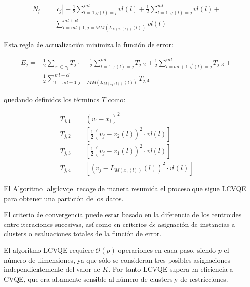 \begin{equation}
\begin{split}
N_j = & |c_j| + \frac{1}{2} \sum_{l=1,g(l) = j}^{ml} vl(l) + 
\frac{1}{2} \sum_{l=1,g^\prime (l) = j}^{ml} vl(l) + \\
& \sum_{l=ml+1,j = MM(L_{M(x_1(l))}(l))}^{ml + cl} vl(l)
\end{split}
\label{eqn41}
\end{equation}

Esta regla de actualización minimiza la función de error:

\begin{equation}
\begin{split}
E_j = & \frac{1}{2} \sum_{x_i \in c_j} T_{j,1} + 
\frac{1}{2} \sum_{l=1,g(l) = j}^{ml} T_{j,2} + 
\frac{1}{2} \sum_{l=ml + 1,g^\prime(l) = j}^{ml} T_{j,3} + \\
&\frac{1}{2} \sum_{l=ml+1,j = MM(L_{M(x_1(l))}(l))}^{ml + cl} T_{j,4}
\end{split}
\label{eqn42}
\end{equation}

quedando definidos los términos $T$ como:

\begin{equation}
\begin{split}
T_{j,1} &= (v_j - x_i)^2\\
T_{j,2} &= \left[ \frac{1}{2} (v_j - x_2(l))^2 \cdot vl(l) \right]\\
T_{j,3} &= \left[ \frac{1}{2} (v_j - x_1(l))^2 \cdot vl(l) \right]\\
T_{j,4} &= \left[ (v_j - L_{M(x_1(l))}(l))^2 \cdot vl(l) \right]
\end{split}
\label{eqn43}
\end{equation}

El Algoritmo \ref{alg:lcvqe} recoge de manera resumida el proceso que sigue \acs{LCVQE} para obtener una partición de los datos. 

El criterio de convergencia puede estar basado en la diferencia de los centroides entre iteraciones sucesivas, así como en criterios de asignación de instancias a clusters o evaluaciones totales de la función de error.

El algoritmo \acs{LCVQE} requiere $\mathcal{O}(p)$ operaciones en cada paso, siendo $p$ el número de dimensiones, ya que sólo se consideran tres posibles asignaciones, independientemente del valor de $K$. Por tanto \acs{LCVQE} supera en eficiencia a \acs{CVQE}, que era altamente sensible al número de clusters y de restricciones.

